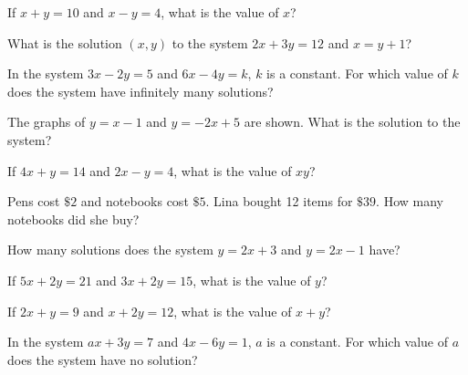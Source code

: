 \begin{exo}{}
If $x+y=10$ and $x-y=4$, what is the value of $x$?
\end{exo}
\begin{exo}{}
What is the solution $(x,y)$ to the system $2x+3y=12$ and $x=y+1$?
\end{exo}
\begin{exo}{}
In the system $3x-2y=5$ and $6x-4y=k$, $k$ is a constant. For which value of $k$ does the system have infinitely many solutions?
\end{exo}
\begin{exo}{}
The graphs of $y=x-1$ and $y=-2x+5$ are shown. What is the solution to the system?
\end{exo}
\begin{exo}{\sprtag}
If $4x+y=14$ and $2x-y=4$, what is the value of $xy$?
\end{exo}
\begin{exo}{}
Pens cost $\$2$ and notebooks cost $\$5$. Lina bought 12 items for $\$39$. How many notebooks did she buy?
\end{exo}
\begin{exo}{}
How many solutions does the system $y=2x+3$ and $y=2x-1$ have?
\end{exo}
\begin{exo}{\sprtag}
If $5x+2y=21$ and $3x+2y=15$, what is the value of $y$?
\end{exo}
\begin{exo}{}
If $2x+y=9$ and $x+2y=12$, what is the value of $x+y$?
\end{exo}
\begin{exo}{\sprtag}
In the system $ax+3y=7$ and $4x-6y=1$, $a$ is a constant. For which value of $a$ does the system have no solution?
\end{exo}

